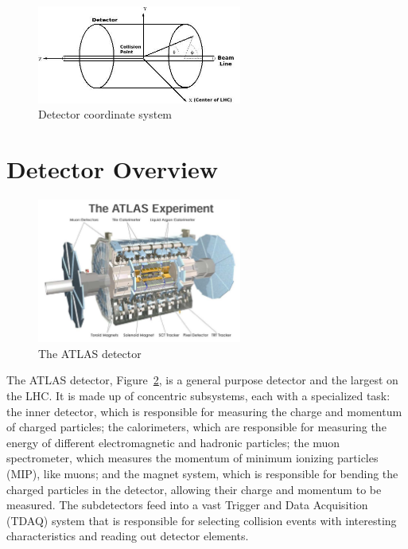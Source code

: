 \begin{figure}[h]
\begin{center}
\includegraphics*[width=0.60\textwidth] {figures/coordinate}
\caption[Detector coordinate system]{Detector coordinate system \cite{phdthesis}}
\label{fig:coord}
\end{center}
\end{figure}



\section{Detector Overview}
\begin{figure}[h]
\begin{center}
\includegraphics*[width=0.60\textwidth] {figures/ATLAS_det}
\caption[The ATLAS detector]{The ATLAS detector \cite{Collaboration_2008}}
\label{fig:ATLAS_det}
\end{center}
\end{figure}
The ATLAS detector, Figure~\ref{fig:ATLAS_det}, is a general purpose detector and the largest on the LHC.  It is made up of concentric subsystems, each with a specialized task: the inner detector, which is responsible for measuring the charge and momentum of charged particles; the calorimeters, which are responsible for measuring the energy of different electromagnetic and hadronic particles; the muon spectrometer, which measures the momentum of minimum ionizing particles (MIP), like muons; and the magnet system, which is responsible for bending the charged particles in the detector, allowing their charge and momentum to be measured. The subdetectors feed into a vast Trigger and Data Acquisition (TDAQ) system that is responsible for selecting collision events with interesting characteristics and reading out detector elements.
%
